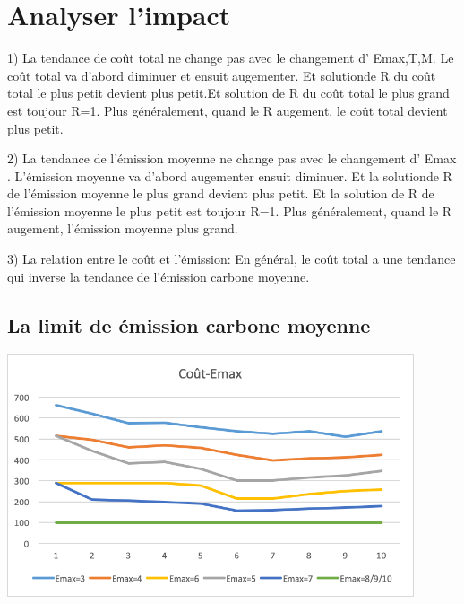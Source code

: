 \documentclass[12pt,a4paper]{article}
\begin{document}
\section{Analyser l'impact}
\begin{justify}
1) La tendance de coût total ne change pas avec le changement d' Emax,T,M. Le coût total va d'abord diminuer et ensuit augementer.  Et solutionde R du coût total le plus petit devient plus petit.Et solution de R du coût total le plus grand est toujour R=1.
Plus généralement, quand le R augement,  le coût total devient plus petit.
\end{justify}
\begin{justify}
2)
La tendance de l'émission moyenne ne change pas avec le changement d' Emax . L'émission moyenne va d'abord augementer ensuit diminuer.  Et la solutionde R de l'émission  moyenne le plus grand devient plus petit. Et la solution de R de l'émission moyenne le plus petit est toujour R=1.
Plus généralement, quand le R augement, l'émission moyenne plus grand. 
\end{justify}
\begin{justify}
3) La relation entre le coût et l'émission: En général, le coût total a une tendance qui inverse la tendance de l'émission carbone moyenne.
\end{justify}
\subsection{La limit de émission carbone moyenne}
 \begin{minipage}[r]{.99\linewidth}
	\center\includegraphics[width=12cm]{img/change/cout-emax.png}
\begin{center}
	\end{center}
\end{minipage}
\end{document}
